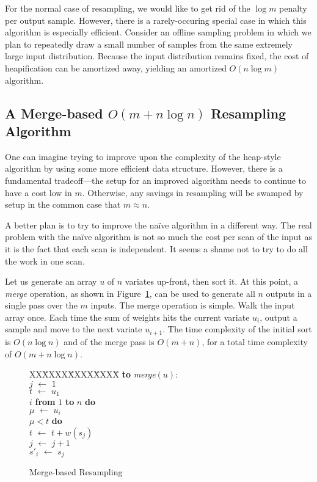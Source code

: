\documentclass[12pt]{article}
\newcommand{\asgn}{\,\,\leftarrow\,\,}
\begin{document}
  For the normal case of resampling, we would like to get
  rid of the $\log m$ penalty per output sample.  However,
  there is a rarely-occuring special case in which this
  algorithm is especially efficient.  Consider an offline
  sampling problem in which we plan to repeatedly draw a
  small number of samples from the same extremely large
  input distribution.  Because the input distribution
  remains fixed, the cost of heapification can be amortized
  away, yielding an amortized $O(n \log m)$ algorithm.

\subsection{A Merge-based $O(m + n \log n)$ Resampling Algorithm}\label{sec-merge}

  One can imagine trying to improve upon the complexity of
  the heap-style algorithm by using some more efficient data
  structure.  However, there is a fundamental tradeoff---the
  setup for an improved algorithm needs to continue to have
  a cost low in $m$.  Otherwise, any savings in resampling
  will be swamped by setup in the common case that $m
  \approx n$.

  A better plan is to try to improve the na\"ive algorithm
  in a different way.  The real problem with the na\"ive
  algorithm is not so much the cost per scan of the input as it is the
  fact that each scan is independent.  It seems a shame not
  to try to do all the work in one scan.

  Let us generate an array $u$ of $n$ variates up-front,
  then sort it.  At this point, a {\em merge} operation, as
  shown in Figure~\ref{fig-merge}, can be used to generate
  all $n$ outputs in a single pass over the $m$ inputs.  The
  merge operation is simple.  Walk the input array once.
  Each time the sum of weights hits the current variate
  $u_i$, output a sample and move to the next variate
  $u_{i+1}$.  The time complexity of the initial sort is
  $O(n \log n)$ and of the merge pass is $O(m + n)$, for a
  total time complexity of $O(m + n \log n)$.

  \begin{figure}
    \centering
    \begin{minipage}{0.6\textwidth}
      \begin{tabbing}
      XX\=XXXX\=XXXX\=XXXX\=\kill
      {\bf to} {\it merge}$(u)$: \\
      \>$j \asgn 1$ \\
      \>$t \asgn u_1$ \\
       $i$ {\bf from} $1$ {\bf to} $n$ {\bf do} \\
      \>\>$\mu \asgn u_i$ \\
      \> $\mu < t$ {\bf do} \\
      \>\>\>$t \asgn t + w(s_j)$ \\
      \>\>\>$j \asgn j + 1$ \\
      \>\>$s'_i \asgn s_j$
    \end{tabbing}
    \end{minipage}
    \caption{Merge-based Resampling}\label{fig-merge}
  \end{figure}
\end{document}
